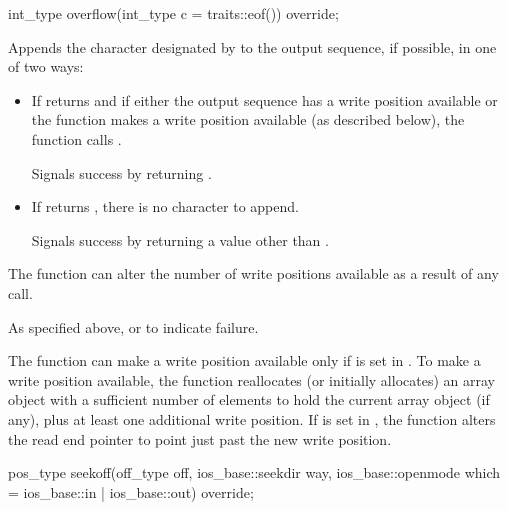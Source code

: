 %
\begin{itemdecl}
int_type overflow(int_type c = traits::eof()) override;
\end{itemdecl}

\begin{itemdescr}
\pnum
\effects
Appends the character designated by  to the output
sequence, if possible, in one of two ways:
\begin{itemize}
\item
If
returns
and if either
the output sequence has a write position available or
the function makes a write position available
(as described below),
the function calls
.

Signals success by returning .

\item
If
returns
,
there is no character to append.

Signals success by returning a value other than
.
\end{itemize}

\pnum
\remarks
The function can alter the number of write positions available as a
result of any call.

\pnum
\returns
As specified above, or
to indicate failure.

\pnum
The function can make a write position available only if
 is set in .
To make a write position available,
the function reallocates (or initially allocates) an array object
with a sufficient number of elements to hold
the current array object (if any), plus
at least
one additional write position.
If  is set in ,
the function alters the read end pointer
to point just past the new write position.
\end{itemdescr}

%
\begin{itemdecl}
pos_type seekoff(off_type off, ios_base::seekdir way,
                 ios_base::openmode which
                   = ios_base::in | ios_base::out) override;
\end{itemdecl}

